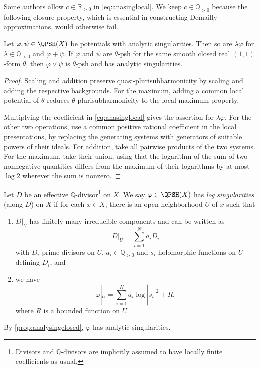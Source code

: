 Some authors allow $c\in \mathbb{R}_{>0}$ in \eqref{eq:anasinglocal}. We keep $c\in \mathbb{Q}_{>0}$ because the following closure property, which is essential in constructing Demailly approximations, would otherwise fail.
\begin{proposition}\label{prop:analysingclosed}
    Let $\varphi,\psi\in \QPSH(X)$ be potentials with analytic singularities. Then so are $\lambda\varphi$ for $\lambda\in \mathbb{Q}_{>0}$ and $\varphi+\psi$. If $\varphi$ and $\psi$ are $\theta$-psh for the same smooth closed real $(1,1)$-form $\theta$, then $\varphi\lor\psi$ is $\theta$-psh and has analytic singularities.
\end{proposition}
\begin{proof}
    Scaling and addition preserve quasi-plurisubharmonicity by scaling and adding the respective backgrounds. For the maximum, adding a common local potential of $\theta$ reduces $\theta$-plurisubharmonicity to the local maximum property.

    Multiplying the coefficient in \eqref{eq:anasinglocal} gives the assertion for $\lambda\varphi$. For the other two operations, use a common positive rational coefficient in the local presentations, by replacing the generating systems with generators of suitable powers of their ideals. For addition, take all pairwise products of the two systems. For the maximum, take their union, using that the logarithm of the sum of two nonnegative quantities differs from the maximum of their logarithms by at most $\log 2$ wherever the sum is nonzero.
\end{proof}

\begin{definition}\label{def:pshfunctions:L1393}
    Let $D$ be an effective $\mathbb{Q}$-divisor\footnote{Divisors and $\mathbb{Q}$-divisors are implicitly assumed to have locally finite coefficients as usual.} on $X$.
    We say $\varphi\in \QPSH(X)$ has \emph{log singularities} (along $D$) on $X$ if for each $x\in X$, there is an open neighborhood $U$ of $x$ such that
    \begin{enumerate}
        \item\label{itm:chapter-pshfunctions:L1415:1} $D|_U$ has finitely many irreducible components and can be written as
        \[
            D|_U=\sum_{i=1}^N a_i D_i
        \]
        with $D_i$ prime divisors on $U$, $a_i\in \mathbb{Q}_{>0}$ and $s_i$ holomorphic functions on $U$ defining $D_i$, and
        \item\label{itm:chapter-pshfunctions:L1415:2} we have
        \begin{equation}\label{eq:logsingreminder}
            \varphi|_U=\sum_{i=1}^N a_i\log |s_i|^2+R,
        \end{equation}
        where $R$ is a bounded function on $U$.
    \end{enumerate}
\end{definition}
By \cref{prop:analysingclosed}, $\varphi$ has analytic singularities.


